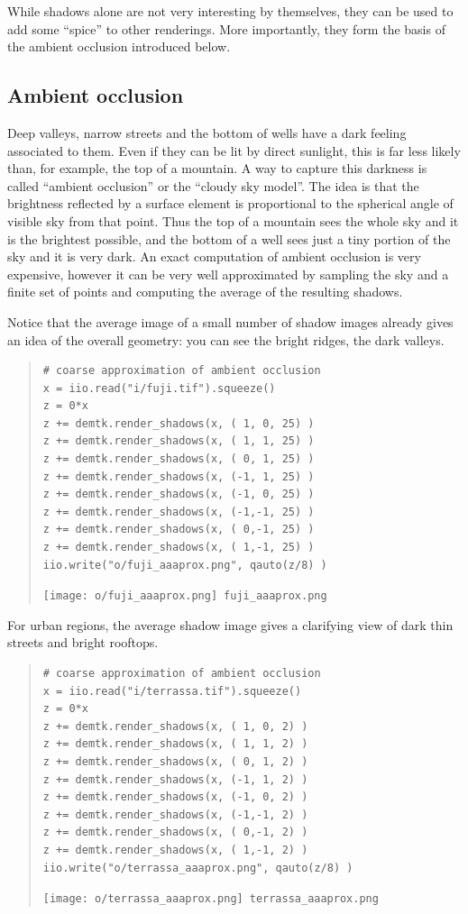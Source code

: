 While shadows alone are not very interesting by themselves, they can be used
to add some ``spice'' to other renderings.  More importantly, they form the
basis of the ambient occlusion introduced below.


\clearpage
\subsection{Ambient occlusion}

Deep valleys, narrow streets and the bottom of wells have a dark feeling
associated to them.  Even if they can be lit by direct sunlight, this is far
less likely than, for example, the top of a mountain.  A way to capture this
darkness is called ``ambient occlusion'' or the ``cloudy sky model''.  The
idea is that the brightness reflected by a surface element is proportional to
the spherical angle of visible sky from that point.  Thus the top of a
mountain sees the whole sky and it is the brightest possible, and the bottom
of a well sees just a tiny portion of the sky and it is very dark.  An exact
computation of ambient occlusion is very expensive, however it can be
very well approximated by sampling the sky and a finite set of points and
computing the average of the resulting shadows.


Notice that the average image of a small number of shadow images already
gives an idea of the overall geometry: you can see the bright ridges, the
dark valleys.
\begin{quote}
\begin{verbatim}
# coarse approximation of ambient occlusion
x = iio.read("i/fuji.tif").squeeze()
z = 0*x
z += demtk.render_shadows(x, ( 1, 0, 25) )
z += demtk.render_shadows(x, ( 1, 1, 25) )
z += demtk.render_shadows(x, ( 0, 1, 25) )
z += demtk.render_shadows(x, (-1, 1, 25) )
z += demtk.render_shadows(x, (-1, 0, 25) )
z += demtk.render_shadows(x, (-1,-1, 25) )
z += demtk.render_shadows(x, ( 0,-1, 25) )
z += demtk.render_shadows(x, ( 1,-1, 25) )
iio.write("o/fuji_aaaprox.png", qauto(z/8) )
\end{verbatim}
\texttt{[image: o/fuji\_aaaprox.png]}~\verb+fuji_aaaprox.png+
\end{quote}

For urban regions, the average shadow image gives a clarifying view of dark
thin streets and bright rooftops.
\begin{quote}
\begin{verbatim}
# coarse approximation of ambient occlusion
x = iio.read("i/terrassa.tif").squeeze()
z = 0*x
z += demtk.render_shadows(x, ( 1, 0, 2) )
z += demtk.render_shadows(x, ( 1, 1, 2) )
z += demtk.render_shadows(x, ( 0, 1, 2) )
z += demtk.render_shadows(x, (-1, 1, 2) )
z += demtk.render_shadows(x, (-1, 0, 2) )
z += demtk.render_shadows(x, (-1,-1, 2) )
z += demtk.render_shadows(x, ( 0,-1, 2) )
z += demtk.render_shadows(x, ( 1,-1, 2) )
iio.write("o/terrassa_aaaprox.png", qauto(z/8) )
\end{verbatim}
\texttt{[image: o/terrassa\_aaaprox.png]}~\verb+terrassa_aaaprox.png+
\end{quote}

